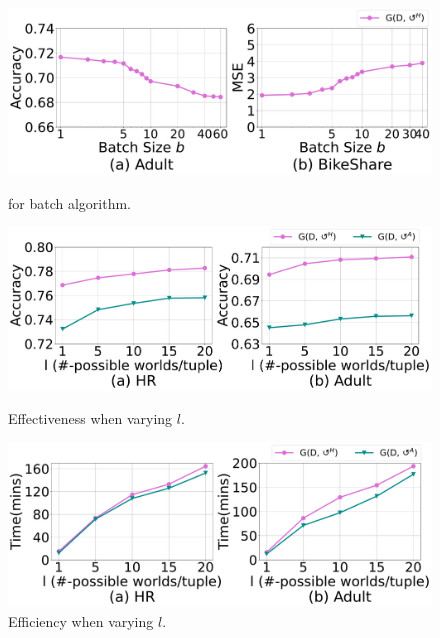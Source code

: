 \begin{figure}   
	\centering
	\begin{minipage}[t]{0.32\textwidth}
		\centering
		\includegraphics[width=\columnwidth]{figs/batchsize}
		\vspace{-2.5em}
		\caption{\ours for batch algorithm.}
		\label{fig:batchalg}
	\end{minipage}
	\begin{minipage}[t]{0.32\textwidth}
		\centering
		\includegraphics[width=\columnwidth]{figs/vary_l_effectiveness}
		\vspace{-2.5em}
		\caption{Effectiveness when varying $l$.}
		\label{fig:vary_l_effect}
	\end{minipage}
	\begin{minipage}[t]{0.32\textwidth}
		\centering
		\includegraphics[width=\columnwidth]{figs/vary_l_efficiency}
		\vspace{-2.5em}
		\caption{Efficiency when varying $l$.}
		\label{fig:vary_l_efficient}
	\end{minipage}
\end{figure}





